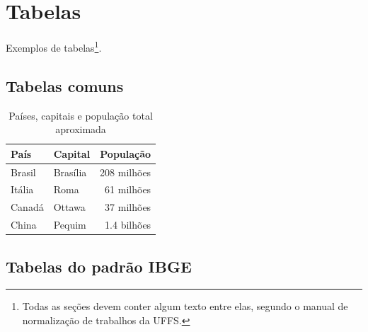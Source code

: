 \documentclass[serif, brazilian]{uffstex}
\begin{document}
\chapter{Tabelas}

Exemplos de tabelas\footnote{Todas as seções devem conter algum texto entre elas, segundo o manual de normalização de trabalhos da UFFS.}.

\section{Tabelas comuns}

\begin{table}[h]
  \centering
  \caption{Países, capitais e população total aproximada}
  \begin{tabular}{@{}llr@{}}
    \toprule %
    País   & Capital  & População\footnotemark\\
    \midrule %
    Brasil & Brasília & 208 milhões\\
    Itália & Roma     & 61 milhões\\
    Canadá & Ottawa   & 37 milhões\\
    China  & Pequim   & 1.4 bilhões\\
    \bottomrule %
  \end{tabular}
  \label{tab:paises}
\end{table}

\section{Tabelas do padrão IBGE}
\end{document}
